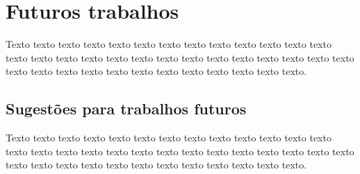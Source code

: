 \chapter{Futuros trabalhos}

Texto texto texto texto texto texto texto texto texto texto texto texto texto texto texto texto texto texto texto texto texto texto texto texto texto texto texto texto texto texto texto texto texto texto texto texto texto texto texto.

\section{Sugestões para trabalhos futuros}

Texto texto texto texto texto texto texto texto texto texto texto texto texto texto texto texto texto texto texto texto texto texto texto texto texto texto texto texto texto texto texto texto texto texto texto texto texto texto texto.
